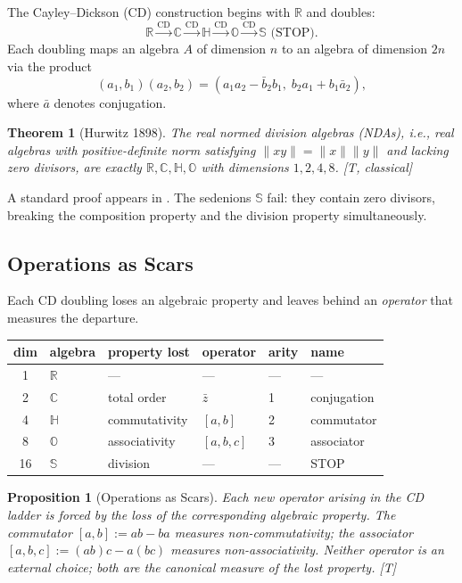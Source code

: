 \documentclass[11pt, a4paper]{article}
\newtheorem{theorem}{Theorem}
\newtheorem{proposition}{Proposition}
\newcommand{\R}{\mathbb{R}}
\newcommand{\C}{\mathbb{C}}
\newcommand{\Hq}{\mathbb{H}}
\newcommand{\Oct}{\mathbb{O}}
\newcommand{\Sed}{\mathbb{S}}
\newcommand{\norm}[1]{\lVert #1 \rVert}
\begin{document}
The Cayley--Dickson (CD) construction begins with $\R$ and doubles:
\begin{equation}
\R \xrightarrow{\mathrm{CD}} \C \xrightarrow{\mathrm{CD}}
\Hq \xrightarrow{\mathrm{CD}} \Oct \xrightarrow{\mathrm{CD}}
\Sed \text{ (STOP).}
\end{equation}
Each doubling maps an algebra $A$ of dimension $n$ to an algebra of
dimension $2n$ via the product
\begin{equation}
(a_1, b_1)(a_2, b_2) = (a_1 a_2 - \bar{b}_2 b_1,\; b_2 a_1 + b_1 \bar{a}_2),
\label{eq:cd_product}
\end{equation}
where $\bar{a}$ denotes conjugation.

\begin{theorem}[Hurwitz 1898]
\label{thm:hurwitz}
The real normed division algebras (NDAs), i.e., real algebras with
positive-definite norm satisfying $\norm{xy} = \norm{x}\norm{y}$ and
lacking zero divisors, are exactly $\R, \C, \Hq, \Oct$ with
dimensions $1, 2, 4, 8$. [T, classical]
\end{theorem}

A standard proof appears in \citep{Baez2002}. The sedenions $\Sed$
fail: they contain zero divisors, breaking the composition property
and the division property simultaneously.

\subsection{Operations as Scars}

Each CD doubling loses an algebraic property and leaves behind an
\emph{operator} that measures the departure.

\begin{center}
\begin{tabular}{@{}clllll@{}}
\toprule
dim & algebra & property lost & operator & arity & name \\
\midrule
1 & $\R$ & --- & --- & --- & --- \\
2 & $\C$ & total order & $\bar{z}$ & 1 & conjugation \\
4 & $\Hq$ & commutativity & $[a,b]$ & 2 & commutator \\
8 & $\Oct$ & associativity & $[a,b,c]$ & 3 & associator \\
16 & $\Sed$ & division & --- & --- & STOP \\
\bottomrule
\end{tabular}
\end{center}

\begin{proposition}[Operations as Scars]
\label{prop:scars}
Each new operator arising in the CD ladder is forced by the loss
of the corresponding algebraic property. The commutator
$[a,b] := ab - ba$ measures non-commutativity; the associator
$[a,b,c] := (ab)c - a(bc)$ measures non-associativity. Neither
operator is an external choice; both are the canonical measure of
the lost property. [T]
\end{proposition}
\end{document}
